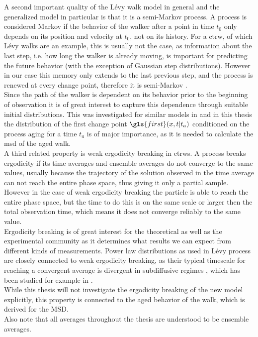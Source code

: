 {A second important quality of the L\'evy walk model in general and the generalized model in particular is that it is a semi-Markov process. A process is considered Markov if the behavior of the walker after a point in time $t_0$ only depends on its position and velocity at $t_0$, not on its history. For a \gls{ctrw}, of which L\'evy walks are an example, this is usually not the case, as information about the last step, i.e. how long the walker is already moving, is important for predicting the future behavior (with the exception of Gaussian step distributions). However in our case this memory only extends to the last previous step, and the process is renewed at every change point, therefore it is semi-Markov \cite{lwreview}. \\
Since the path of the walker is dependent on its behavior prior to the beginning of observation it is of great interest to capture this dependence through suitable initial distributions. This was investigated for similar models in \cite{barkai2003a, barkai2003b} and in this thesis the distribution of the first change point $\gls{first}(x,t|t_a)$ conditioned on the process aging for a time $t_a$ is of major importance, as it is needed to calculate the \gls{msd} of the aged walk.\\

A third related property is weak ergodicity breaking in \gls{ctrw}s. A process breaks ergodicity if its time averages and ensemble averages do not converge to the same values, usually because the trajectory of the solution observed in the time average can not reach the entire phase space, thus giving it only a partial sample. However in the case of weak ergodicity breaking the particle is able to reach the entire phase space, but the time to do this is on the same scale or larger then the total observation time, which means it does not converge reliably to the same value. \\
Ergodicity breaking is of great interest for the theoretical as well as the experimental community as it determines what results we can expect from different kinds of measurements. Power law distributions as used in L\'evy process are closely connected to weak ergodicity breaking, as their typical timescale for reaching a convergent average is divergent in subdiffusive regimes \cite{anomalousTransport}, which has been studied for example in \cite{brokmann2003,radons2018}.\\
While this thesis will not investigate the ergodicity breaking of the new model explicitly, this property is connected to the aged behavior of the walk, which is derived for the MSD. \\
}
Also note that all averages throughout the thesis are understood to be ensemble averages.

